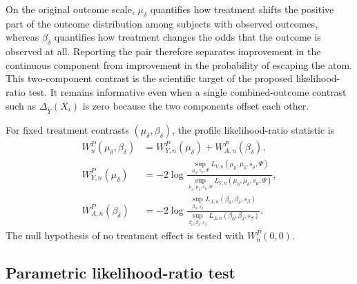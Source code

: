 \documentclass[11pt]{article}
\begin{document}
On the original outcome scale, $\mu_\delta$ quantifies how treatment shifts the positive part of the outcome distribution among subjects with observed outcomes, whereas $\beta_\delta$ quantifies how treatment changes the odds that the outcome is observed at all. Reporting the pair therefore separates improvement in the continuous component from improvement in the probability of escaping the atom. This two-component contrast is the scientific target of the proposed likelihood-ratio test. It remains informative even when a single combined-outcome contrast such as $\Delta_{\widetilde{Y}}(X_i)$ is zero because the two components offset each other.

For fixed treatment contrasts $(\mu_\delta,\beta_\delta)$, the profile likelihood-ratio statistic is
\begin{equation}
\label{eq:LRTtotal}
\begin{aligned}
  W_n^P(\mu_\delta, \beta_\delta)
  &= W_{Y,n}^P(\mu_\delta) + W_{A,n}^P(\beta_\delta),\\
  W_{Y,n}^P(\mu_\delta)
  &= -2\log \frac{\sup\limits_{\mu_0, s_\mu, \Psi} L_{Y,n}(\mu_0, \mu_\delta, s_\mu, \Psi)}
  {\sup\limits_{\mu_0, \mu_\delta, s_\mu, \Psi} L_{Y,n}(\mu_0, \mu_\delta, s_\mu, \Psi)},\\
  W_{A,n}^P(\beta_\delta)
  &= -2\log \frac{\sup\limits_{\beta_0, s_\beta} L_{A,n}(\beta_0, \beta_\delta, s_\beta)}
  {\sup\limits_{\beta_0, \beta_\delta, s_\beta} L_{A,n}(\beta_0, \beta_\delta, s_\beta)}.
\end{aligned}
\end{equation}
The null hypothesis of no treatment effect is tested with $W_n^P(0,0)$.

\subsection{Parametric likelihood-ratio test}
\end{document}

